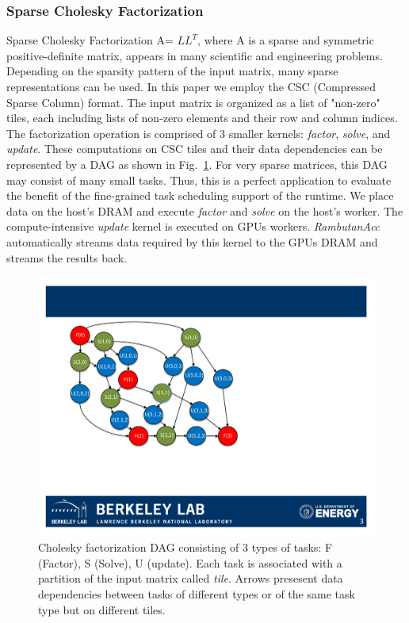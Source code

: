 \subsubsection{Sparse Cholesky Factorization}
Sparse Cholesky Factorization A= $LL^T$, where A is a sparse and symmetric positive-definite matrix,
appears in many scientific and engineering problems.
Depending on the sparsity pattern of the input matrix, many sparse representations can be used.
In this paper we employ the CSC (Compressed Sparse Column) format. 
The input matrix is organized as a list of "non-zero" tiles, each including lists of non-zero elements and their row and column indices.
The factorization operation is comprised of 3 smaller kernels: {\em factor}, {\em solve}, and {\em update}.
These computations on CSC tiles and their data dependencies can be represented by a DAG as shown in Fig.~\ref{fig:cholesky}. 
For very sparse matrices, this DAG may consist of many small tasks.
Thus, this is a perfect application to evaluate the benefit of the fine-grained task scheduling support of the runtime.
We place data on the host's DRAM and execute {\em factor} and {\em solve} on the host's worker.
The compute-intensive {\em update} kernel is executed on GPUs workers.
{\em RambutanAcc} automatically streams data required by this kernel to the GPUs DRAM and streams the results back.

\begin{figure}[htb]
\centering
\includegraphics[width=.3\textwidth]{figures/cholesky.pdf}
\caption{Cholesky factorization DAG consisting of 3 types of tasks: F (Factor), S (Solve), U (update). Each task is associated with a partition of the input matrix called {\em tile}. Arrows presesent data dependencies between tasks of different types or of the same task type but on different tiles.}
\label{fig:cholesky}
\end{figure}


